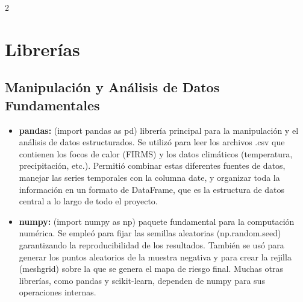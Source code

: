 \documentclass[a4paper,10pt]{article}
\begin{document}
\begin{multicols}{2}

\section{Librerías}
\subsection{Manipulación y Análisis de Datos Fundamentales}
\begin{itemize}
    \item \textbf{pandas:} (import pandas as pd) librería principal para la manipulación y el análisis de datos estructurados. Se utilizó para leer los archivos .csv que contienen los focos de calor (FIRMS) y los datos climáticos (temperatura, precipitación, etc.). Permitió combinar estas diferentes fuentes de datos, manejar las series temporales con la columna date, y organizar toda la información en un formato de DataFrame, que es la estructura de datos central a lo largo de todo el proyecto.
    \item \textbf{numpy:} (import numpy as np) paquete fundamental para la computación numérica. Se empleó para fijar las semillas aleatorias (np.random.seed) garantizando la reproducibilidad de los resultados. También se usó para generar los puntos aleatorios de la muestra negativa y para crear la rejilla (meshgrid) sobre la que se genera el mapa de riesgo final. Muchas otras librerías, como pandas y scikit-learn, dependen de numpy para sus operaciones internas.
\end{itemize}

\end{multicols}
\end{document}
